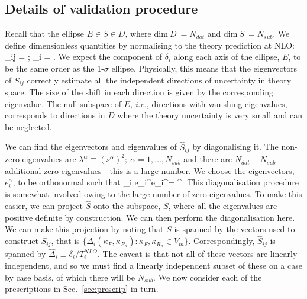 \subsection{Details of validation procedure}
\label{subsec:val_details}
Recall that the ellipse $E \in S \in D$, where $\text{dim}\ D\ = N_{dat}$ and $\text{dim}\ S\ = N_{sub}$.
We define dimensionless quantities by normalising to the theory prediction at NLO:
\beq 
{}_{ij} = ; \qquad \delta_i = .
\eeq
We expect the component of $\delta_i$ along each axis of the ellipse, $E$, to be the same order as the 1-$\sigma$ ellipse. Physically, this means that the eigenvectors of $S_{ij}$ correctly estimate all the independent directions of uncertainty in theory space. The size of the shift in each direction is given by the corresponding eigenvalue. The null subspace of $E$, \textit{i.e.}, directions with vanishing eigenvalues, corresponds to directions in $D$ where the theory uncertainty is very small and can be neglected.

We can find the eigenvectors and eigenvalues of $\widehat{S}_{ij}$ by diagonalising it. The non-zero eigenvalues are $\lambda^\alpha \equiv (s^\alpha)^2;\ \alpha =1,\dots,N_{sub}$ and there are $N_{dat} - N_{sub}$ additional zero eigenvalues - this is a large number. We choose the eigenvectors, $e_i^\alpha$, to be orthonormal such that
\be
\sum_i e_i^\alpha e_i^\beta = \delta^{\alpha \beta}.
\ee
This diagonalisation procedure is somewhat involved owing to the large number of zero eigenvalues. To make this easier, we can project $\widehat{S}$ onto the subspace, $S$, where all the eigenvalues are positive definite by construction. We can then perform the diagonalisation here. We can make this projection by noting that $S$ is spanned by the vectors used to construct $S_{ij}$, that is $\{\Delta_i(\kappa_F, \kappa_{R_a}): \kappa_F, \kappa_{R_a} \in V_m\}$. Correspondingly, $\widehat{S}_{ij}$ is spanned by $\widehat{\Delta}_i \equiv \delta_i/T_i^{NLO}$. The caveat is that not all of these vectors are linearly independent, and so we must find a linearly independent subset of these on a case by case basis, of which there will be $N_{sub}$. We now consider each of the prescriptions in Sec.~\ref{sec:prescrip} in turn.
